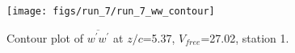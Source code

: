 \begin{figure}[H]
\centering
\texttt{[image: figs/run\_7/run\_7\_ww\_contour]}
\caption{Contour plot of $\overline{w^\prime w^\prime}$ at $z/c$=5.37, $V_{free}$=27.02, station 1.}
\label{fig:run_7_ww_contour}
\end{figure}



